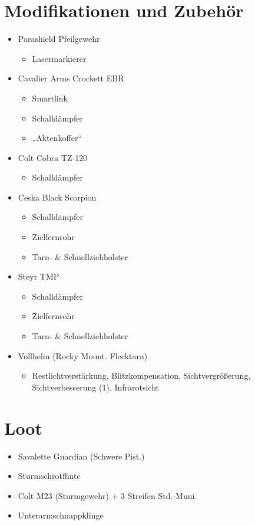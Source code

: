 {\begin{multicols}{2}
\section*{Modifikationen und Zubehör}
\begin{itemize}
	\item Parashield Pfeilgewehr
		\begin{itemize}
			\item  Lasermarkierer
		\end{itemize}
	\item Cavalier Arms Crockett EBR
		\begin{itemize}
			\item Smartlink
			\item Schalldämpfer
			\item „Aktenkoffer“
		\end{itemize}
	\item Colt Cobra TZ-120
		\begin{itemize}
			\item Schalldämpfer
		\end{itemize}
	\item Ceska Black Scorpion
		\begin{itemize}
			\item Schalldämpfer
			\item Zielfernrohr
			\item Tarn- \& Schnellziehholster
		\end{itemize}
	\item Steyr TMP
		\begin{itemize}
			\item Schalldämpfer
			\item Zielfernrohr
			\item Tarn- \& Schnellziehholster
		\end{itemize}
	\item Vollhelm (Rocky Mount. Flecktarn)
		\begin{itemize}
			\item Restlichtverstärkung, Blitzkompensation, Sichtvergrößerung,
						Sichtverbesserung (1), Infrarotsicht
		\end{itemize}
\end{itemize}


\section*{Loot}
\begin{itemize}
	\item Savalette Guardian (Schwere Pist.)
	\item Sturmschrotflinte
	\item Colt M23 (Sturmgewehr) + 3 Streifen Std.-Muni.
	\item Unterarmschnappklinge
\end{itemize}
\vphantom{2cm}


\end{multicols}}
